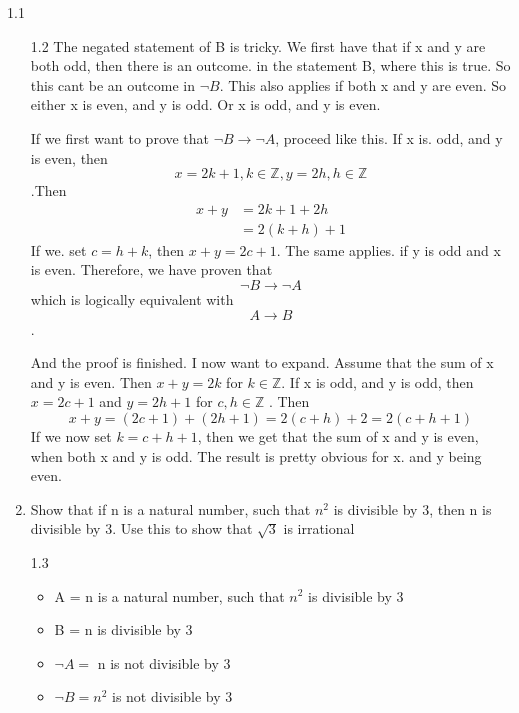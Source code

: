 \documentclass[a4paper,norsk]{article}
\begin{document}
\begin{oppgavebox}{1.1}{}
\begin{enumerate}
\begin{proofbox}{1.2}{}
    The negated statement of B is tricky. We first have that if x and y are both odd, then there is an outcome. in the statement B,  where this is true. So this cant be an outcome in $ \neg B $. This also applies if both x and y are even. So either x is even, and y is odd. Or x is odd, and y is even. 

    If we first want to prove that $ \neg B \rightarrow \neg A $, proceed like this. If x is. odd, and y is even, then 
    \[
        x =2k+1, k \in \mathbb{Z}, y = 2h, h \in \mathbb{Z}
    \]
    .Then 
    \begin{align*}
      x + y &= 2k+1 + 2h \\
      &= 2 \left( k +h \right) + 1
    \end{align*}
    If we. set $ c = h+k $, then $ x+y = 2c + 1 $. The same applies. if y is odd and x is even. Therefore, we have proven that 
    \[
        \neg B \rightarrow \neg A
    \]
    which is logically equivalent with 
    \[
        A \rightarrow B
    \].


    And the proof is finished. I now want to expand. Assume that the sum of x and y is even. Then $ x+y=2k $ for $ k \in \mathbb{Z} $. If x is odd, and y is odd,  then $ x=2c+1 $   and $ y=2h+1 $ for $ c, h \in \mathbb{Z} $ . Then 
    \[
        x+y = \left( 2c+1 \right) + \left( 2h+1 \right) = 2 \left( c+h \right) + 2 = 2 \left( c+h+1 \right) 
    \]
    If we now set $ k = c+h+1 $, then we get that the sum of x and y is even,  when both x and y is odd. The result is pretty obvious for x. and y being even. 
  \end{proofbox}

  \item Show that if n is a natural number,  such that $ n^2 $ is divisible by 3, then n is divisible by 3. Use this to show that $ \sqrt{ 3 } $ is irrational
  \begin{proofbox}{1.3}{}
    \begin{itemize}
      \item A = n is a natural number, such that $ n^2 $ is divisible by 3 
      \item B = n is divisible by 3
    \end{itemize}

    \begin{itemize}
      \item $ \neg A = $ n is not divisible by 3
      \item $ \neg B = n^2 $ is not divisible by 3
    \end{itemize}


\end{proofbox}
\end{enumerate}
\end{oppgavebox}
\end{document}
